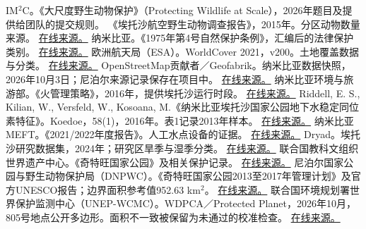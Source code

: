 \documentclass[12pt,a4paper]{article}
\numberwithin{equation}{section}
\begin{document}
\begingroup
{}
\begin{thebibliography}{99}
\raggedright\setlength{\itemsep}{2pt}\setlength{\parskip}{0pt}
 IM$^2$C。《大尺度野生动物保护》（Protecting Wildlife at Scale），2026年题目及提供给团队的提交规则。
 《埃托沙航空野生动物调查报告》，2015年。分区动物数量来源。 \href{https://rhinoresourcecenter.com/wp-content/uploads/2022/01/1642693511.pdf}{在线来源。}
 纳米比亚。《1975年第4号自然保护条例》，汇编后的法律保护类别。 \href{https://namibiatradeportal.gov.na/application/files/3617/2986/2681/Nature_Conservation_Ordinance_4_of_1975.pdf}{在线来源。}
 欧洲航天局（ESA）。WorldCover 2021，v200。土地覆盖数据与分类。 \href{https://esa-worldcover.org/en/data-access}{在线来源。}
 OpenStreetMap贡献者／Geofabrik。纳米比亚数据快照，2026年10月3日；尼泊尔来源记录保存在项目中。 \href{https://download.geofabrik.de/africa/namibia.html}{在线来源。}
 纳米比亚环境与旅游部。《火管理策略》，2016年，提供埃托沙运行时段。 \href{https://www.meft.gov.na/files/downloads/66c_Fire%20Management_Strategy%20Final%20Version.pdf}{在线来源。}
 Riddell, E. S., Kilian, W., Versfeld, W., Kosoana, M.《纳米比亚埃托沙国家公园地下水稳定同位素特征》。Koedoe，58(1)，2016年。表1记录2013年样本。 \href{https://koedoe.co.za/index.php/koedoe/article/view/1329/1890}{在线来源。}
 纳米比亚MEFT。《2021/2022年度报告》。人工水点设备的证据。 \href{https://www.meft.gov.na/files/downloads/MEFT%20Annual%20Report%202021-2022.pdf}{在线来源。}
 Dryad。埃托沙研究数据集，2024年；研究区旱季与湿季分类。 \href{https://datadryad.org/dataset/doi:10.5061/dryad.4qrfj6qm3}{在线来源。}
 联合国教科文组织世界遗产中心。《奇特旺国家公园》及相关保护记录。 \href{https://whc.unesco.org/en/list/284}{在线来源。}
 尼泊尔国家公园与野生动物保护局（DNPWC）。《奇特旺国家公园2013至2017年管理计划》及官方UNESCO报告；边界面积参考值952.63 km$^2$。 \href{https://dnpwc.gov.np/media/files/UNESCO_Report_of_Chitwan_National_Park.pdf}{在线来源。}
 联合国环境规划署世界保护监测中心（UNEP-WCMC）。WDPCA／Protected Planet，2026年10月，805号地点公开多边形。面积不一致被保留为未通过的校准检查。 \href{https://data-gis.unep-wcmc.org/server/rest/services/ProtectedPlanet/WDPCA/FeatureServer/1}{在线来源。}

\end{thebibliography}
\end{document}
